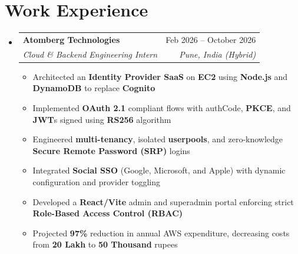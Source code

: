 \documentclass[letterpaper,11pt]{article}
\makeatletter
\newcommand{\resumeItem}[1]{\item\small{{#1 \vspace{-2pt}}}}
\newcommand{\resumeSubheading}[4]{
  \vspace{-2pt}\item
    \begin{tabular*}{0.97\textwidth}[t]{l@{\extracolsep{\fill}}r}
      \textbf{#1} & #2 \\
      \textit{\small#3} & \textit{\small #4} \\
    \end{tabular*}\vspace{-7pt}
}
\newcommand{\resumeSubHeadingListStart}{\begin{itemize}[leftmargin=0.15in, label={}]}
\newcommand{\resumeSubHeadingListEnd}{\end{itemize}}
\newcommand{\resumeItemListStart}{\begin{itemize}}
\newcommand{\resumeItemListEnd}{\end{itemize}\vspace{-5pt}}
\makeatother
\begin{document}
\section{Work Experience}
  \resumeSubHeadingListStart
    \resumeSubheading
      {Atomberg Technologies}{Feb 2026 -- October 2026}
      {Cloud \& Backend Engineering Intern}{Pune, India (Hybrid)}
      \resumeItemListStart

      \resumeItem{Architected an \textbf{Identity Provider SaaS} on \textbf{EC2} using \textbf{Node.js} and \textbf{DynamoDB} to replace \textbf{Cognito}}
      \resumeItem{Implemented \textbf{OAuth 2.1} compliant flows with authCode, \textbf{PKCE}, and \textbf{JWT}s signed using \textbf{RS256} algorithm}
      \resumeItem{Engineered \textbf{multi-tenancy}, isolated \textbf{userpools}, and zero-knowledge \textbf{Secure Remote Password (SRP)} logins}
      \resumeItem{Integrated \textbf{Social SSO} (Google, Microsoft, and Apple) with dynamic configuration and provider toggling}
      \resumeItem{Developed a \textbf{React/Vite} admin and superadmin portal enforcing strict \textbf{Role-Based Access Control (RBAC)}}
\resumeItem{Projected \textbf{97\%} reduction in annual AWS expenditure, decreasing costs from \textbf{20 Lakh} to \textbf{50 Thousand} rupees}
      \resumeItemListEnd
  \resumeSubHeadingListEnd

\end{document}
